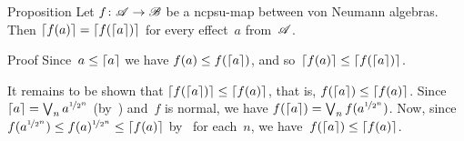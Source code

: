 \documentclass[main]{subfiles}
\begin{document}
%
%
%
\begin{parsec}%
\begin{point}{Proposition}%
Let $f\colon \mathscr{A}\to\mathscr{B}$ be a ncpsu-map
between von Neumann algebras.
Then $\left\lceil f(a)\right\rceil=\left\lceil f(\left\lceil a\right\rceil)\right\rceil$
for every effect~$a$ from~$\mathscr{A}$.
\end{point}
\begin{point}{Proof}%
Since~$a\leq \left\lceil a\right\rceil$
we have $f(a)\leq f(\left\lceil a\right\rceil)$,
and so~$\left\lceil f(a)\right\rceil\leq \left\lceil f(\left\lceil a\right\rceil)\right\rceil$.
\begin{point}%
It remains to be shown that $\left\lceil f(\left\lceil a\right\rceil)\right\rceil\leq \left\lceil f(a)\right\rceil$,
that is, $f(\left\lceil a\right\rceil)\leq \left\lceil f(a)\right\rceil$.
Since  $\left\lceil a\right\rceil=\bigvee_n a^{\nicefrac{1}{2^n}}$ 
(by~)
and~$f$ is normal,
we have $f(\left\lceil a\right\rceil)=\bigvee_n f(a^{\nicefrac{1}{2^n}})$.
Now, since $f(a^{\nicefrac{1}{2^n}})\leq f(a)^{\nicefrac{1}{2^n}}
\leq \left\lceil f(a)\right\rceil$
by~ for each~$n$,
we have~$f(\left\lceil a\right\rceil)\leq \left\lceil f(a)\right\rceil$.
\end{point}
\end{point}
\end{parsec}
\end{document}
